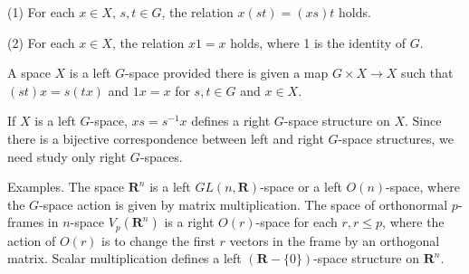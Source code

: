 (1) For each $x \in X$, $s, t \in G$, the relation $x(st) = (xs)t$ holds.

(2) For each $x \in X$, the relation $x1 = x$ holds, where 1 is the identity of $G$.

A space $X$ is a left $G$-space provided there is given a map $G \times X \rightarrow X$ such that $(st)x = s(tx)$ and $1x = x$ for $s, t \in G$ and $x \in X$.

If $X$ is a left $G$-space, $xs = s^{-1}x$ defines a right $G$-space structure on $X$. Since there is a bijective correspondence between left and right $G$-space structures, we need study only right $G$-spaces.

Examples. The space $\mathbf{R}^n$ is a left $GL(n, \mathbf{R})$-space or a left $O(n)$-space, where the $G$-space action is given by matrix multiplication. The space of orthonormal $p$-frames in $n$-space $V_p(\mathbf{R}^n)$ is a right $O(r)$-space for each $r, r \leq p$, where the action of $O(r)$ is to change the first $r$ vectors in the frame by an orthogonal matrix. Scalar multiplication defines a left $(\mathbf{R} - \{0\})$-space structure on $\mathbf{R}^n$.
